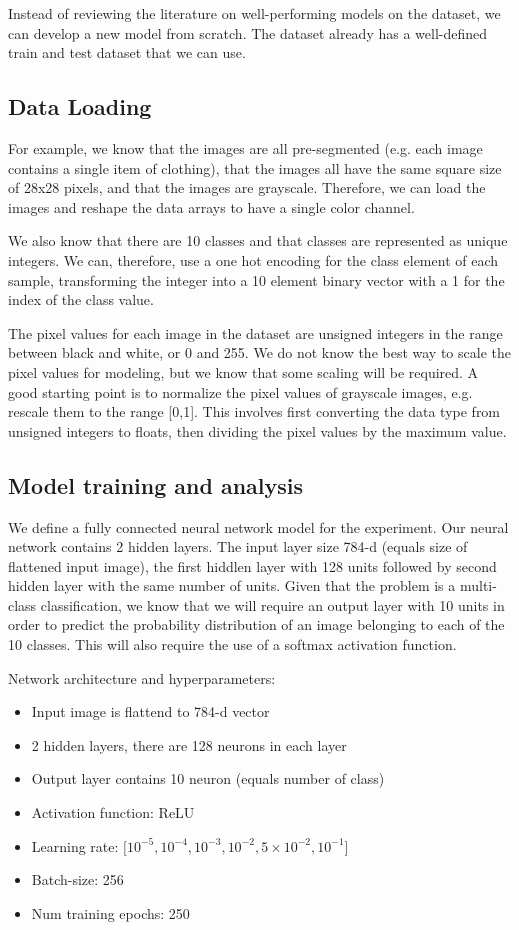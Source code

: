 \documentclass[14pt, a4paper]{article}
\numberwithin{equation}{section}
\numberwithin{algorithm}{section}
\numberwithin{figure}{section}
\begin{document}
Instead of reviewing the literature on well-performing models on the dataset, we can develop a new model from scratch.
The dataset already has a well-defined train and test dataset that we can use.

\subsection{Data Loading}

For example, we know that the images are all pre-segmented (e.g. each image contains a single item of clothing), that the images all have the same square size of 28x28 pixels, and that the images are grayscale. Therefore, we can load the images and reshape the data arrays to have a single color channel.

We also know that there are 10 classes and that classes are represented as unique integers.
We can, therefore, use a one hot encoding for the class element of each sample, transforming the integer into a 10 element binary vector with a 1 for the index of the class value.

The pixel values for each image in the dataset are unsigned integers in the range between black and white, or 0 and 255.
We do not know the best way to scale the pixel values for modeling, but we know that some scaling will be required.
A good starting point is to normalize the pixel values of grayscale images, e.g. rescale them to the range [0,1]. 
This involves first converting the data type from unsigned integers to floats, then dividing the pixel values by the maximum value.

\subsection{Model training and analysis}

We define a fully connected neural network model for the experiment.
Our neural network contains 2 hidden layers. The input layer size 784-d (equals size of flattened input image),
the first hiddlen layer with 128 units followed by second hidden layer with the same number of units.
Given that the problem is a multi-class classification, we know that we will require an output layer with 10 units in order to predict the probability distribution of an image belonging to each of the 10 classes. 
This will also require the use of a softmax activation function.

Network architecture and hyperparameters:
\begin{itemize}
	  \item Input image is flattend to 784-d vector
		\item 2 hidden layers, there are 128 neurons in each layer
  	\item Output layer contains 10 neuron (equals number of class)
   	\item Activation function: ReLU
    \item Learning rate: $\lbrack 10^{-5}, 10^{-4}, 10^{-3}, 10^{-2}, 5\times10^{-2}, 10^{-1} \rbrack$
    \item Batch-size: 256
    \item Num training epochs: 250
\end{itemize}
\end{document}
